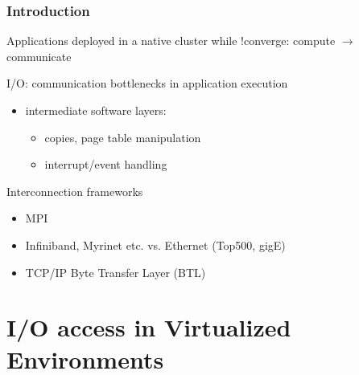 \documentclass[red,slidestop,notes,compress,mathserif]{beamer}
\begin{document}
\begin{frame}
\frametitle{Introduction}
\begin{block}{Applications deployed in a native cluster}
while !converge:
compute $\rightarrow$ communicate
\end{block}

\begin{block}{I/O: communication bottlenecks in application execution}
\begin{itemize}
\item intermediate software layers:
        \begin{itemize}
                \item copies, page table manipulation
                \item interrupt/event handling
        \end{itemize}
\end{itemize}
\end{block}

\pause

\begin{block}{Interconnection frameworks}
\begin{itemize}
\item MPI
\item Infiniband, Myrinet etc. vs. Ethernet (Top500, gigE)
\item TCP/IP Byte Transfer Layer (BTL)
\end{itemize}
\end{block}
\end{frame}

\section{I/O access in Virtualized Environments}
\end{document}
